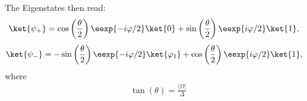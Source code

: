 The Eigenstates then read:
\begin{align}
				\ket{\psi_+}&=\cos\left(\frac{\theta}{2}\right) \eexp{-i{\varphi}/{2}}\ket{0}+\sin\left(\frac{\theta}{2}\right) \eexp{i{\varphi}/{2}}\ket{1}, \label{eq:staticpsiplus}
\end{align}
\begin{align}
				\ket{\psi_-}&=-\sin\left(\frac{\theta}{2}\right) \eexp{-i{\varphi}/{2}}\ket{\varphi_1}+\cos\left(\frac{\theta}{2}\right) \eexp{i{\varphi}/{2}}\ket{1}, \label{eq:staticpsiminus}
\end{align}
where 
\begin{align} \label{eq:parameters}
	\tan(\theta) = \frac{|\Omega|}{\Delta} 
\end{align}